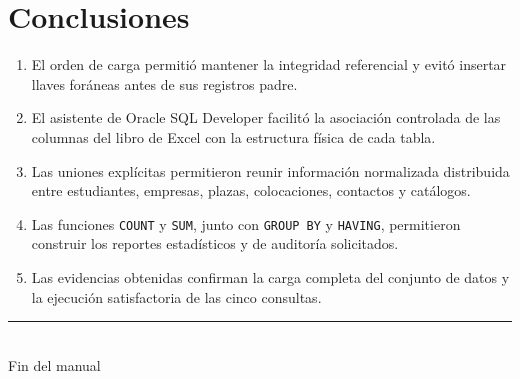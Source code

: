 \documentclass[11pt,letterpaper]{article}
\begin{document}
\section{Conclusiones}

\begin{enumerate}
  \item El orden de carga permitió mantener la integridad referencial y evitó insertar
        llaves foráneas antes de sus registros padre.
  \item El asistente de Oracle SQL Developer facilitó la asociación controlada de las
        columnas del libro de Excel con la estructura física de cada tabla.
  \item Las uniones explícitas permitieron reunir información normalizada distribuida
        entre estudiantes, empresas, plazas, colocaciones, contactos y catálogos.
  \item Las funciones \texttt{COUNT} y \texttt{SUM}, junto con \texttt{GROUP BY} y
        \texttt{HAVING}, permitieron construir los reportes estadísticos y de auditoría
        solicitados.
  \item Las evidencias obtenidas confirman la carga completa del conjunto de datos y la
        ejecución satisfactoria de las cinco consultas.
\end{enumerate}

\vfill
\begin{center}
  \color{AccentRed}\rule{0.35\textwidth}{1.2pt}\\[0.5em]
  {\small\color{Muted}Fin del manual}
\end{center}
\end{document}
